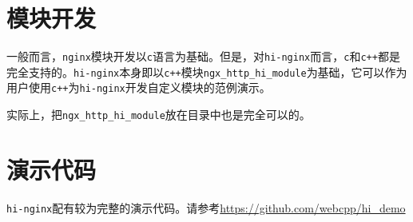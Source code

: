 \section{模块开发}
一般而言，\texttt{nginx}模块开发以\texttt{c}语言为基础。但是，对\texttt{hi-nginx}而言，\texttt{c}和\texttt{c++}都是完全支持的。\texttt{hi-nginx}本身即以\texttt{c++}模块\texttt{ngx_http_hi_module}为基础，它可以作为用户使用\texttt{c++}为\texttt{hi-nginx}开发自定义模块的范例演示。

实际上，把\texttt{ngx_http_hi_module}放在目录中也是完全可以的。

\section{演示代码}
\texttt{hi-nginx}配有较为完整的演示代码。请参考\url{https://github.com/webcpp/hi_demo}



